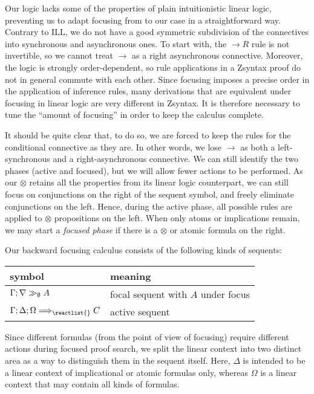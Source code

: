 Our logic lacks some of the properties of plain intuitionistic linear logic,
preventing us to adapt focusing from \cite{chaudhuri-thesis} to our case in a
straightforward way. Contrary to ILL, we do not have a good symmetric
subdivision of the connectives into synchronous and asynchronous ones. To start
with, the $\rightarrow R$ rule is not invertible, so we cannot treat
$\rightarrow$ as a right asynchronous connective. Moreover, the logic is
strongly order-dependent, so rule applications in a Zsyntax proof do not in
general commute with each other. Since focusing imposes a precise order in the
application of inference rules, many derivations that are equivalent under
focusing in linear logic are very different in Zsyntax. It is therefore
necessary to tune the ``amount of focusing'' in order to keep the calculus
complete.

It should be quite clear that, to do so, we are forced to keep the rules for the
conditional connective as they are. In other words, we lose $\rightarrow$ as
both a left-synchronous and a right-asynchronous connective. We can still
identify the two phases (active and focused), but we will allow fewer actions to
be performed. As our $\otimes$ retains all the properties from its linear logic
counterpart, we can still focus on conjunctions on the right of the sequent
symbol, and freely eliminate conjunctions on the left. Hence, during the active
phase, all possible rules are applied to $\otimes$ propositions on the
left. When only atoms or implications remain, we may start a \emph{focused
  phase} if there is a $\otimes$ or atomic formula on the right.

Our backward focusing calculus consists of the following kinds of sequents:

\begin{table}[h]
  \centering
  \begin{tabular}{|l|l|}
    \hline
    \textbf{symbol} & \textbf{meaning} \\
    \hline
    $\Gamma; \nabla \gg_{\emptyset} A$ & focal sequent with $A$ under focus \\
    $\ztriseq{\Gamma}{\Delta}{\Omega}{\reactlist{}}{C}$ & active sequent \\
    \hline
  \end{tabular}
\end{table}

Since different formulas (from the point of view of focusing) require different
actions during focused proof search, we split the linear context into two
distinct area as a way to distinguish them in the sequent itself. Here, $\Delta$
is intended to be a linear context of implicational or atomic formulas only,
whereas $\Omega$ is a linear context that may contain all kinds of formulas.

